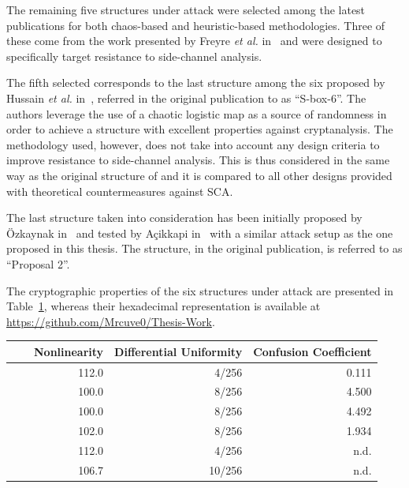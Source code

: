         The remaining five \sbocs{} structures under attack were selected among the latest publications for both chaos-based and heuristic-based methodologies. Three of these come from the work presented by Freyre \emph{et al.} in~\cite{freyre2020evolving} and were designed to specifically target resistance to side-channel analysis.

        The fifth \sbocs{} selected corresponds to the last structure among the six proposed by Hussain \emph{et al.} in~\cite{hussain2013efficient}, referred in the original publication to as ``S-box-6''. The authors leverage the use of a chaotic logistic map as a source of randomness in order to achieve a structure with excellent properties against cryptanalysis. The methodology used, however, does not take into account any design criteria to improve resistance to side-channel analysis. This \sbocs{} is thus considered in the same way as the original structure of \aes{} and it is compared to all other designs provided with theoretical countermeasures against SCA.
        
        The last structure taken into consideration has been initially proposed by Özkaynak in~\cite{ozkaynak2019construction} and tested by Açikkapi in~\cite{accikkapi2019side} with a similar attack setup as the one proposed in this thesis. The structure, in the original publication, is referred to as ``Proposal 2''.

        The cryptographic properties of the six structures under attack are presented in Table~\ref{tab:sbox_prop}, whereas their hexadecimal representation is available at \url{https://github.com/Mrcuve0/Thesis-Work}.

        \begin{table}[]\label{tab:sbox_prop}
            \centering
            \begin{tabular}{@{}lrrr@{}}
                \toprule
                \sbocs{}& Nonlinearity& Differential Uniformity& Confusion Coefficient                      \\ \midrule
                \xaes{}~\cite{daemen1999aes}~\cite{picek2014confused}& 112.0        & 4/256         & 0.111 \\
                \xfone{}~\cite{freyre2020evolving}              & 100.0             & 8/256         & 4.500 \\
                \xftwo{}~\cite{freyre2020evolving}              & 100.0             & 8/256         & 4.492 \\
                \xfthree{}~\cite{freyre2020evolving}            & 102.0             & 8/256         & 1.934 \\
                \xhussain{}~\cite{hussain2013efficient}         & 112.0             & 4/256         & n.d.  \\
                \xozkaynak{}~\cite{ozkaynak2019construction}    & 106.7             & 10/256        & n.d.
            \end{tabular}
        \end{table}

